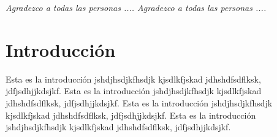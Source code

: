 \documentclass[12pt,letterpaper,spanish]{report}
\newenvironment{dedication}{\newpage\large\null\em\vskip1in}%
{\vfill}
\begin{document}
        \thispagestyle{empty}

        \begin{dedication}
           Agradezco a todas las personas .... Agradezco a todas las personas ....
%
%
        \end{dedication}




\tableofcontents



\oddsidemargin 0.2in \textwidth 6.5in \topmargin -0.25in
\textheight 9in \pagestyle{myheadings}

\newpage



\chapter{Introducción}
\newpage


Esta es la introducción jshdjhsdjkfhsdjk kjsdlkfjskad jdhshdfsdflksk, jdfjsdhjjkdsjkf.
Esta es la introducción jshdjhsdjkfhsdjk kjsdlkfjskad jdhshdfsdflksk, jdfjsdhjjkdsjkf.
Esta es la introducción jshdjhsdjkfhsdjk kjsdlkfjskad jdhshdfsdflksk, jdfjsdhjjkdsjkf.
Esta es la introducción jshdjhsdjkfhsdjk kjsdlkfjskad jdhshdfsdflksk, jdfjsdhjjkdsjkf.
\\
\end{document}
